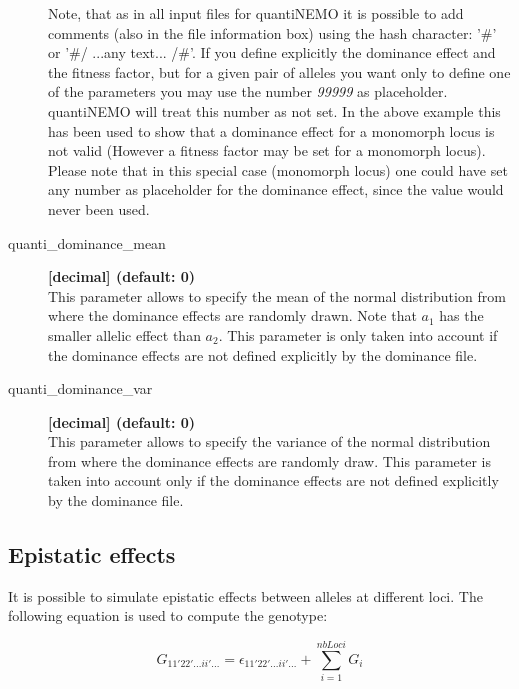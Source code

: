 \documentclass[letterpaper,12pt,oneside]{book}
\begin{document}
\begin{description}
\begin{description}
\end{description} 
Note, that as in all input files for quantiNEMO it is possible to add comments (also in the file information box) using the hash character: '\#' or '\#/ ...any text... /\#'. If you define explicitly the dominance effect and the fitness factor, but for a given pair of alleles you want only to define one of the parameters you may use the number \textit{99999} as placeholder. quantiNEMO will treat this number as not set. In the above example this has been used to show that a dominance effect for a monomorph locus is not valid (However a fitness factor may be set for a monomorph locus). Please note that in this special case (monomorph locus) one could have set any number as placeholder for the dominance effect, since the value would never been used.   

\item[quanti\_dominance\_mean\index{quanti\_dominance\_mean}] \textbf{[decimal] (default: 0)} \\
This parameter allows to specify the mean of the normal distribution from where the dominance effects are randomly drawn. Note that $a_{1}$ has the smaller allelic effect than $a_{2}$. This parameter is only taken into account if the dominance effects are not defined explicitly by the dominance file.

\item[quanti\_dominance\_var\index{quanti\_dominance\_var}] \textbf{[decimal] (default: 0)} \\
This parameter allows to specify the variance of the normal distribution from where the dominance effects are randomly draw. This parameter is taken into account only if the dominance effects are not defined explicitly by the dominance file.
\end{description} 


\subsection{Epistatic effects}
It is possible to simulate epistatic effects between alleles at different loci. The following equation is used to compute the genotype:

\[G_{11'22'...ii'...}=\epsilon_{11'22'...ii'...}+\sum_{i=1}^{nbLoci}G_{i} \]
\end{document}
